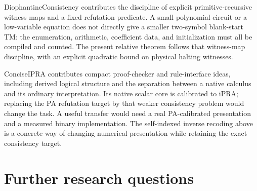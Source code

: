 \documentclass[11pt,letterpaper]{article}
\begin{document}
DiophantineConsistency \cite{dio} contributes the discipline of explicit
primitive-recursive witness maps and a fixed refutation predicate. A
small polynomial circuit or a low-variable equation does not directly
give a smaller two-symbol blank-start TM: the enumeration, arithmetic,
coefficient data, and initialization must all be compiled and counted.
The present relative theorem follows that witness-map discipline, with
an explicit quadratic bound on physical halting witnesses.

ConciseIPRA \cite{ipra} contributes compact proof-checker and rule-interface ideas,
including derived logical structure and the separation between a native
calculus and its ordinary interpretation. Its native scalar core is
calibrated to iPRA; replacing the PA refutation target by that weaker
consistency problem would change the task. A useful transfer would need
a real PA-calibrated presentation and a measured binary implementation.
The self-indexed inverse recoding above is a concrete way of changing
numerical presentation while retaining the exact consistency target.

\section{Further research questions}
\end{document}
